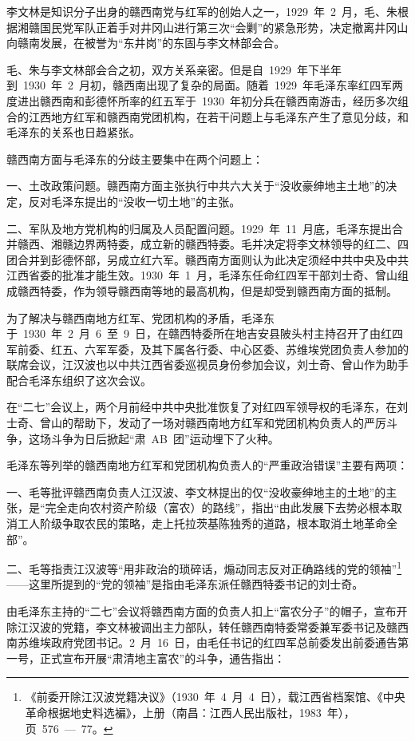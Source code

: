 李文林是知识分子出身的赣西南党与红军的创始人之一，1929~年~2~月，毛、朱根据湘赣国民党军队正着手对井冈山进行第三次“会剿”的紧急形势，决定撤离井冈山向赣南发展，在被誉为“东井岗”的东固与李文林部会合。

毛、朱与李文林部会合之初，双方关系亲密。但是自~1929~年下半年到~1930~年~2~月初，赣西南出现了复杂的局面。随着~1929~年毛泽东率红四军两度进出赣西南和彭德怀所率的红五军于~1930~年初分兵在赣西南游击，经历多次组合的江西地方红军和赣西南党团机构，在若干问题上与毛泽东产生了意见分歧，和毛泽东的关系也日趋紧张。

赣西南方面与毛泽东的分歧主要集中在两个问题上：

一、土改政策问题。赣西南方面主张执行中共六大关于“没收豪绅地主土地”的决定，反对毛泽东提出的“没收一切土地”的主张。

二、军队及地方党机构的归属及人员配置问题。1929~年~11~月底，毛泽东提出合并赣西、湘赣边界两特委，成立新的赣西特委。毛并决定将李文林领导的红二、四团合并到彭德怀部，另成立红六军。赣西南方面则认为此决定须经中共中央及中共江西省委的批准才能生效。1930~年~1~月，毛泽东任命红四军干部刘士奇、曾山组成赣西特委，作为领导赣西南等地的最高机构，但是却受到赣西南方面的抵制。

为了解决与赣西南地方红军、党团机构的矛盾，毛泽东于~1930~年~2~月~6~至~9~日，在赣西特委所在地吉安县陂头村主持召开了由红四军前委、红五、六军军委，及其下属各行委、中心区委、苏维埃党团负责人参加的联席会议，江汉波也以中共江西省委巡视员身份参加会议，刘士奇、曾山作为助手配合毛泽东组织了这次会议。

在“二七”会议上，两个月前经中共中央批准恢复了对红四军领导权的毛泽东，在刘士奇、曾山的帮助下，发动了一场对赣西南地方红军和党团机构负责人的严厉斗争，这场斗争为日后掀起“肃~AB~团”运动埋下了火种。

毛泽东等列举的赣西南地方红军和党团机构负责人的“严重政治错误”主要有两项：

一、毛等批评赣西南负责人江汉波、李文林提出的仅“没收豪绅地主的土地”的主张，是“完全走向农村资产阶级（富农）的路线”，指出“由此发展下去势必根本取消工人阶级争取农民的策略，走上托拉茨基陈独秀的道路，根本取消土地革命全部”。

二、毛等指责江汉波等“用非政治的琐碎话，煽动同志反对正确路线的党的领袖”\footnote{《前委开除江汉波党籍决议》（1930~年~4~月~4~日），载江西省档案馆、《中央革命根据地史料选褊》，上册（南昌：江西人民出版社，1983~年），页~576~—~77。}——这里所提到的“党的领袖”是指由毛泽东派任赣西特委书记的刘士奇。

由毛泽东主持的“二七”会议将赣西南方面的负责人扣上“富农分子”的帽子，宣布开除江汉波的党籍，李文林被调出主力部队，转任赣西南特委常委兼军委书记及赣西南苏维埃政府党团书记。2~月~16~日，由毛任书记的红四军总前委发出前委通告第一号，正式宣布开展“肃清地主富农”的斗争，通告指出：


